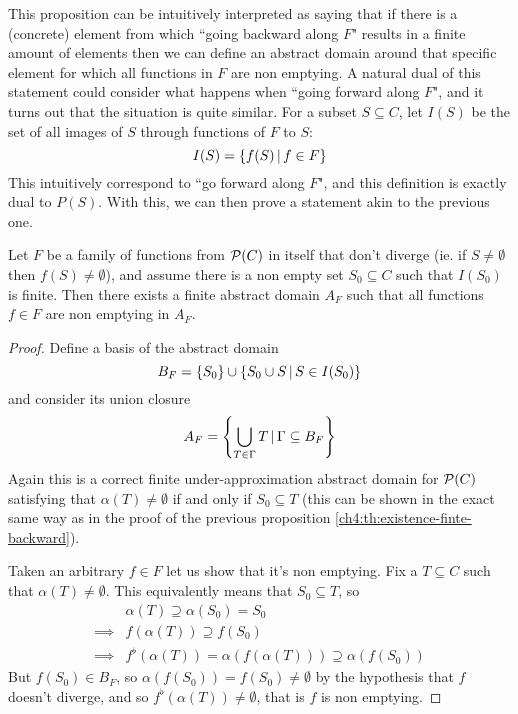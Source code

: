 This proposition can be intuitively interpreted as saying that if there is a (concrete) element from which ``going backward along $F$" results in a finite amount of elements then we can define an abstract domain around that specific element for which all functions in $F$ are non emptying.
A natural dual of this statement could consider what happens when ``going forward along $F$", and it turns out that the situation is quite similar.
For a subset $S \subseteq C$, let $I(S)$ be the set of all images of $S$ through functions of $F$ to $S$:
\[
I(S) = \{ f(S) \,\vert\, f \in F \}
\]
This intuitively correspond to ``go forward along $F$", and this definition is exactly dual to $P(S)$. With this, we can then prove a statement akin to the previous one.
\begin{prop}\label{ch4:th:existence-finte-forward}
	Let $F$ be a family of functions from $\mathcal{P}(C)$ in itself that don't diverge (ie. if $S \neq \emptyset$ then $f(S) \neq \emptyset$), and assume there is a non empty set $S_0 \subseteq C$ such that $I(S_0)$ is finite. Then there exists a finite abstract domain $A_F$ such that all functions $f \in F$ are non emptying in $A_F$.
\end{prop}
\begin{proof}
	Define a basis of the abstract domain
	\[
	B_F = \{ S_0 \} \cup \{ S_0 \cup S \,\vert\, S \in I(S_0) \}
	\]
	and consider its union closure
	\[
	A_F = \left\lbrace \bigcup\limits_{T \in \Gamma} T \,\vert\, \Gamma \subseteq B_F \right\rbrace
	\]
	Again this is a correct finite under-approximation abstract domain for $\mathcal{P}(C)$ satisfying that $\alpha(T) \neq \emptyset$ if and only if $S_0 \subseteq T$ (this can be shown in the exact same way as in the proof of the previous proposition \ref{ch4:th:existence-finte-backward}).

	Taken an arbitrary $f \in F$ let us show that it's non emptying. Fix a $T \subseteq C$ such that $\alpha(T) \neq \emptyset$. This equivalently means that $S_0 \subseteq T$, so
	\begin{align*}
		& \alpha(T) \supseteq \alpha(S_0) = S_0 \\
		\implies& f(\alpha(T)) \supseteq f(S_0) \\
		\implies& f^{\flat}(\alpha(T)) = \alpha(f(\alpha(T))) \supseteq \alpha(f(S_0))
	\end{align*}
	But $f(S_0) \in B_F$, so $\alpha(f(S_0)) = f(S_0) \neq \emptyset$ by the hypothesis that $f$ doesn't diverge, and so $f^{\flat}(\alpha(T)) \neq \emptyset$, that is $f$ is non emptying.
\end{proof}
